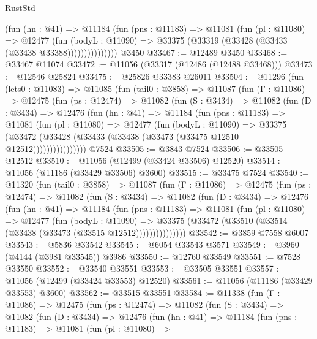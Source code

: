 \begin{lexlean}{RustStd}
\begin{coremodule}
                  (fun (hn : @41) =>
                  @11184
                    (fun (pns : @11183) =>
                    @11081
                      (fun (pl : @11080) =>
                      @12477
                        (fun (bodyL : @11090) =>
                        @33375 (@33319 (@33428 (@33433 (@33438 @33388)))))))))))))))
    @3450
@33467 := @12489 @3450
@33468 := @33467 @11074
@33472 := @11056 (@33317 (@12486 (@12488 @33468)))
@33473 := @12546 @25824
@33475 := @25826 @33383 @26011
@33504 := @11296
    (fun (lets0 : @11083) =>
    @11085
      (fun (tail0 : @3858) =>
      @11087
        (fun (Γ : @11086) =>
        @12475
          (fun (ps : @12474) =>
          @11082
            (fun (S : @3434) =>
            @11082
              (fun (D : @3434) =>
              @12476
                (fun (hn : @41) =>
                @11184
                  (fun (pns : @11183) =>
                  @11081
                    (fun (pl : @11080) =>
                    @12477
                      (fun (bodyL : @11090) =>
                      @33375
                        (@33472
                          (@33428 (@33433 (@33438 (@33473 (@33475 @12510 @12512))))))))))))))))
    @7524
@33505 := @3843 @7524
@33506 := @33505 @12512
@33510 := @11056 (@12499 (@33424 @33506) @12520)
@33514 := @11056 (@11186 (@33429 @33506) @3600)
@33515 := @33475 @7524
@33540 := @11320
    (fun (tail0 : @3858) =>
    @11087
      (fun (Γ : @11086) =>
      @12475
        (fun (ps : @12474) =>
        @11082
          (fun (S : @3434) =>
          @11082
            (fun (D : @3434) =>
            @12476
              (fun (hn : @41) =>
              @11184
                (fun (pns : @11183) =>
                @11081
                  (fun (pl : @11080) =>
                  @12477
                    (fun (bodyL : @11090) =>
                    @33375 (@33472 (@33510 (@33514 (@33438 (@33473 (@33515 @12512)))))))))))))))
@33542 := @3859 @7558 @6007
@33543 := @5836 @33542
@33545 := @6054 @33543 @3571
@33549 := @3960 (@4144 (@3981 @33545)) @3986
@33550 := @12760 @33549
@33551 := @7528 @33550
@33552 := @33540 @33551
@33553 := @33505 @33551
@33557 := @11056 (@12499 (@33424 @33553) @12520)
@33561 := @11056 (@11186 (@33429 @33553) @3600)
@33562 := @33515 @33551
@33584 := @11338
    (fun (Γ : @11086) =>
    @12475
      (fun (ps : @12474) =>
      @11082
        (fun (S : @3434) =>
        @11082
          (fun (D : @3434) =>
          @12476
            (fun (hn : @41) =>
            @11184
              (fun (pns : @11183) =>
              @11081
                (fun (pl : @11080) =>

\end{coremodule}
\end{lexlean}
